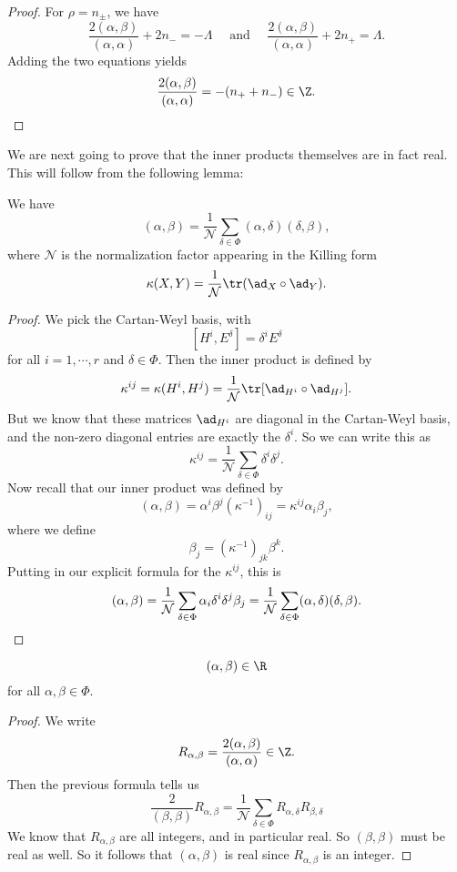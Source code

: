 \documentclass[a4paper]{article}
\begin{document}
\begin{proof}
  For $\rho = n_{\pm}$, we have
  \[
    \frac{2(\alpha, \beta)}{(\alpha,\alpha)} + 2n_- = -\Lambda \quad \text{ and } \quad \frac{2(\alpha, \beta)}{(\alpha,\alpha)} + 2n_+ = \Lambda.
  \]
  Adding the two equations yields
  \[
    \frac{2(\alpha, \beta)}{(\alpha,\alpha)} = - (n_+ + n_-) \in \Z. \qedhere
  \]
\end{proof}

We are next going to prove that the inner products themselves are in fact real. This will follow from the following lemma:
\begin{lemma}
  We have
  \[
    (\alpha, \beta) = \frac{1}{\mathcal{N}} \sum_{\delta \in \Phi} (\alpha, \delta) (\delta, \beta),
  \]
  where $\mathcal{N}$ is the normalization factor appearing in the Killing form
  \[
    \kappa(X, Y) = \frac{1}{\mathcal{N}} \tr(\ad_X \circ \ad_Y).
  \]
\end{lemma}

\begin{proof}
  We pick the Cartan-Weyl basis, with
  \[
    [H^i, E^\delta] = \delta^i E^\delta
  \]
  for all $i = 1, \cdots, r$ and $\delta \in \Phi$. Then the inner product is defined by
  \[
    \kappa^{ij} = \kappa(H^i, H^j) = \frac{1}{\mathcal{N}} \tr [\ad_{H^i} \circ \ad_{H^j}].
  \]
  But we know that these matrices $\ad_{H^i}$ are diagonal in the Cartan-Weyl basis, and the non-zero diagonal entries are exactly the $\delta^i$. So we can write this as
  \[
    \kappa^{ij} = \frac{1}{\mathcal{N}} \sum_{\delta \in \Phi} \delta^i \delta^j.
  \]
  Now recall that our inner product was defined by
  \[
    (\alpha, \beta) = \alpha^i \beta^j (\kappa^{-1})_{ij} = \kappa^{ij} \alpha_i \beta_j,
  \]
  where we define
  \[
    \beta_j = (\kappa^{-1})_{jk} \beta^k.
  \]
  Putting in our explicit formula for the $\kappa^{ij}$, this is
  \[
    (\alpha, \beta) = \frac{1}{\mathcal{N}}\sum_{\delta \in \Phi} \alpha_i \delta^i \delta^j \beta_j = \frac{1}{\mathcal{N}}\sum_{\delta \in \Phi}(\alpha, \delta) (\delta, \beta). \qedhere
  \]
\end{proof}

\begin{cor}
  \[
    (\alpha, \beta) \in \R
  \]
  for all $\alpha, \beta \in \Phi$.
\end{cor}

\begin{proof}
  We write
  \[
    R_{\alpha, \beta} = \frac{2(\alpha, \beta)}{(\alpha, \alpha)} \in \Z.
  \]
  Then the previous formula tells us
  \[
    \frac{2}{(\beta, \beta)} R_{\alpha, \beta} = \frac{1}{\mathcal{N}} \sum_{\delta \in \Phi} R_{\alpha, \delta} R_{\beta, \delta}
  \]
  We know that $R_{\alpha, \beta}$ are all integers, and in particular real. So $(\beta, \beta)$ must be real as well. So it follows that $(\alpha, \beta)$ is real since $R_{\alpha, \beta}$ is an integer.
\end{proof}
\end{document}
